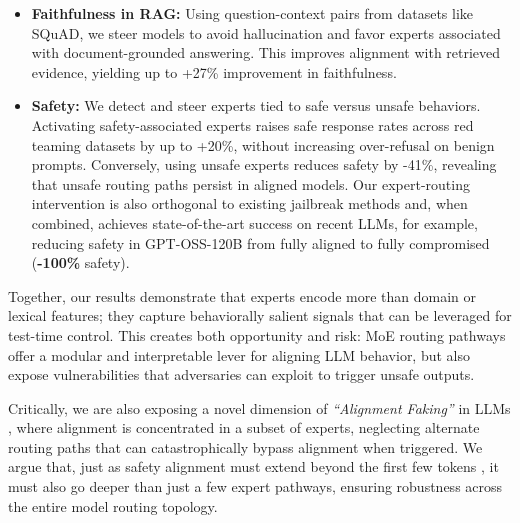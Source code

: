 \documentclass{article} %
\newcommand{\safe}{+20\%}
\newcommand{\unsafe}{-41\%}
\newcommand{\unsafejail}{-100\%}
\newcommand{\faithfulness}{+27\%}
\begin{document}
\begin{itemize}
\vspace{-0.1em}
    \item \textbf{Faithfulness in RAG:} Using question-context pairs from datasets like SQuAD, we steer models to avoid hallucination and favor experts associated with document-grounded answering. This improves alignment with retrieved evidence, yielding up to \faithfulness{} improvement in faithfulness.
    \item \textbf{Safety:} We detect and steer experts tied to safe versus unsafe behaviors. Activating safety-associated experts raises safe response rates across red teaming datasets by up to \safe{}, without increasing over-refusal on benign prompts. Conversely, using unsafe experts reduces safety by \unsafe{}, revealing that unsafe routing paths persist in aligned models.
    Our expert-routing intervention is also orthogonal to existing jailbreak methods and, when combined, achieves state-of-the-art success on recent LLMs, for example, reducing safety in GPT-OSS-120B from fully aligned to fully compromised (\textbf{\unsafejail{}} safety).
\end{itemize}



Together, our results demonstrate that experts encode more than domain or lexical features; they capture behaviorally salient signals that can be leveraged for test-time control. This creates both opportunity and risk: MoE routing pathways offer a modular and interpretable lever for aligning LLM behavior, but also expose vulnerabilities that adversaries can exploit to trigger unsafe outputs. 

Critically, we are also exposing a novel dimension of \emph{``Alignment Faking''} in LLMs \citep{greenblatt2024alignmentfakinglargelanguage, wang-etal-2024-fake}, where alignment is concentrated in a subset of experts, neglecting alternate routing paths that can catastrophically bypass alignment when triggered. We argue that, just as safety alignment must extend beyond the first few tokens \citep{qi2025safety}, it must also go deeper than just a few expert pathways, ensuring robustness across the entire model routing topology.


\end{document}
